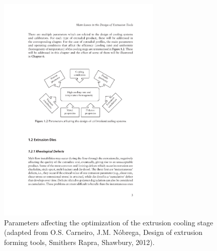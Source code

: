 \begin{figure}[!htb]
\centering
\includegraphics[width=0.7\textwidth]{chap1/include/figures/cooling_parameters.pdf}
\caption[Parameters affecting the optimization of the extrusion cooling stage.]{Parameters affecting the optimization of the extrusion cooling stage (adapted from O.S. Carneiro, J.M. N\'obrega, Design of extrusion forming tools, Smithers Rapra, Shawbury, 2012).}
\label{chap1:fig:polymer_processing_cooling_parameters}
\end{figure}

